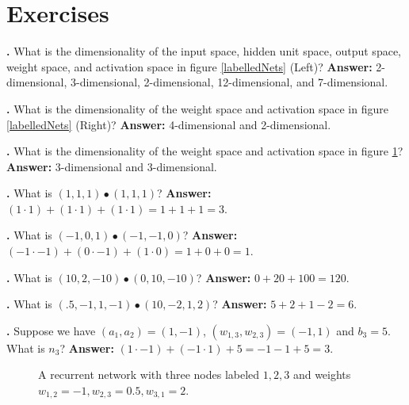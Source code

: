 \section{Exercises}\label{linear_algebra_exercises}


\noindent
{}
{\bf \theLinearAlgebraCounter.}  What is the dimensionality of the input space, hidden unit space, output space, weight space, and activation space in figure \ref{labelledNets} (Left)? 
{\bf Answer:} 2-dimensional, 3-dimensional, 2-dimensional, 12-dimensional, and 7-dimensional.
\bigskip

\noindent
{}
{\bf \theLinearAlgebraCounter.}  What is the dimensionality of the weight space and activation space in figure \ref{labelledNets} (Right)? 
{\bf Answer:} 4-dimensional and 2-dimensional.
\bigskip

\noindent
{}
{\bf \theLinearAlgebraCounter.}  What is the dimensionality of the weight space and activation space in figure \ref{sampleNetRecurrent}? 
{\bf Answer:} 3-dimensional and 3-dimensional.
\bigskip

\noindent
{}
{\bf \theLinearAlgebraCounter.}  What is $(1,1,1) \bullet  (1,1,1)$? 
{\bf Answer:}  $(1 \cdot 1) + (1 \cdot 1) + (1 \cdot 1) = 1 + 1 + 1 = 3$. 
\bigskip

\noindent
{}
{\bf \theLinearAlgebraCounter.}  What is $(-1,0,1) \bullet (-1,-1,0)$? 
{\bf Answer:} $(-1 \cdot -1) + (0 \cdot -1) + (1 \cdot 0) = 1 + 0 + 0 = 1$. 
\bigskip

\noindent
{}
{\bf \theLinearAlgebraCounter.}  What is $(10,2,-10) \bullet  (0,10,-10)$? 
{\bf Answer:}  $0 + 20 + 100 = 120$. 
\bigskip

\noindent
{}
{\bf \theLinearAlgebraCounter.}  What is $(.5,-1,1,-1) \bullet  (10,-2,1,2)$? 
{\bf Answer:}  $5 + 2 + 1 -2 = 6$. 
\bigskip

\noindent
{}
{\bf \theLinearAlgebraCounter.}  Suppose we have $(a_1,a_2) = (1,-1)$, $(w_{1,3}, w_{2,3})=(-1,1)$ and $b_3=5$. What is $n_3$? 
{\bf Answer:} $(1 \cdot -1) + (-1 \cdot 1) + 5 = -1 - 1 + 5 = 3$. 
\bigskip

\begin{figure}[h]
\centering
{}
\caption[Jeff Yoshimi.]{A recurrent network with three nodes labeled $1,2,3$ and weights $w_{1,2} = -1, w_{2,3}=0.5, w_{3,1}=2$.}
\label{sampleNetRecurrent}
\end{figure}

